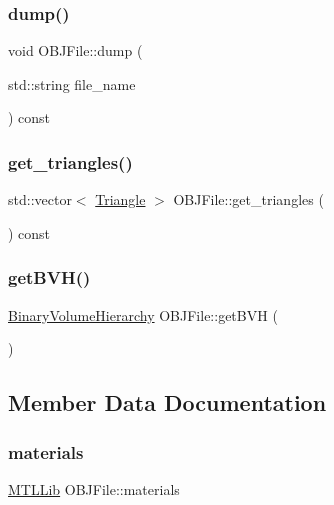 \subsubsection{\texorpdfstring{dump()}{dump()}}
{\footnotesize\ttfamily void O\+B\+J\+File\+::dump (\begin{DoxyParamCaption}\item[{std\+::string}]{file\+\_\+name }\end{DoxyParamCaption}) const}

\mbox{\label{classOBJFile_a109fb06479ee891b78401e95e8b5b64e}} 
\subsubsection{\texorpdfstring{get\_triangles()}{get\_triangles()}}
{\footnotesize\ttfamily std\+::vector$<$ \mbox{\hyperlink{classTriangle}{Triangle}} $>$ O\+B\+J\+File\+::get\+\_\+triangles (\begin{DoxyParamCaption}{ }\end{DoxyParamCaption}) const}

\mbox{\label{classOBJFile_ae3128b473a8b7b837364cc9688cb89dc}} 
\subsubsection{\texorpdfstring{getBVH()}{getBVH()}}
{\footnotesize\ttfamily \mbox{\hyperlink{classBinaryVolumeHierarchy}{Binary\+Volume\+Hierarchy}} O\+B\+J\+File\+::get\+B\+VH (\begin{DoxyParamCaption}{ }\end{DoxyParamCaption})}



\subsection{Member Data Documentation}
\mbox{\label{classOBJFile_a5b08a58ba3f59a931eea6067e29f3e40}} 
\subsubsection{\texorpdfstring{materials}{materials}}
{\footnotesize\ttfamily \mbox{\hyperlink{classMTLLib}{M\+T\+L\+Lib}} O\+B\+J\+File\+::materials\hspace{0.3cm}{\ttfamily [private]}}

